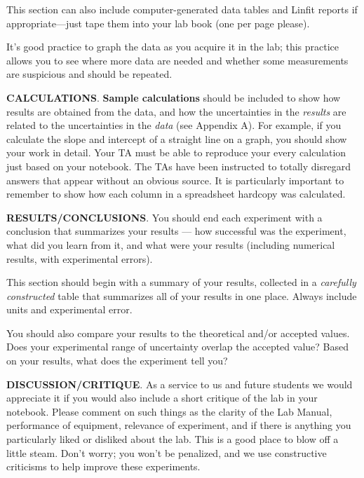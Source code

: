 \begin{description}
This section can also include computer-generated data tables and
Linfit reports if
appropriate---just tape them into your lab book (one per page please).

It's good practice to graph the data as you acquire
it in the lab; this practice allows you to see where more data are
needed
and whether some measurements are suspicious and should be repeated.

\item {\bf CALCULATIONS}.  {\bf Sample calculations} should be included to
show how results are obtained from the data, and how the uncertainties
in the {\em results} are related to the uncertainties in the {\em
data} (see Appendix A).  For example, if you calculate the slope and
intercept of a straight line on a graph, you should show your work
in detail.  Your TA must be able to reproduce your every calculation
just based on your notebook.  The TAs have been instructed to
totally disregard answers that appear without an obvious source.
It is particularly important to remember to show how each column in a
spreadsheet hardcopy was calculated.

\item {\bf RESULTS/CONCLUSIONS}. You should end each experiment with a conclusion that
summarizes your results --- how successful was the experiment, what did
you learn from it, and what were your results (including numerical
results, with experimental errors).

  This section should begin with a
summary of your results, collected in a {\em carefully constructed}
table that summarizes all of your results in one place. Always include
units and experimental error.

You should also compare your results to the theoretical and/or
accepted values.
Does your experimental range of uncertainty overlap the accepted value?
Based on your results, what does the experiment tell you?

\item {\bf DISCUSSION/CRITIQUE}.
As a service to us and future students we would appreciate it if you
would also include a short critique of the lab in your notebook.
  Please
comment on such things as the clarity of the Lab Manual, performance
of equipment, relevance of experiment, and if there is anything you
particularly liked or disliked about the lab.  This is a good place to
blow off a little steam.  Don't worry; you won't be penalized, and we
use constructive criticisms to help improve these experiments.


\end{description}

